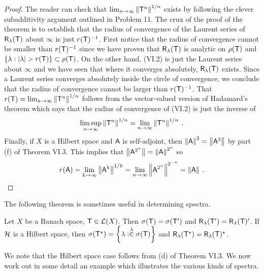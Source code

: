 \begin{proof}
    The reader can check that $\lim_{n \rightarrow \infty} \left \Vert \mathsf{T}^n \right \Vert^{1/n}$ exists by following the clever subadditivity argument outlined in Problem 11. The crux of the proof of the theorem is to establish that the radius of convergence of the Laurent series of $\mathsf{R}_\lambda( \mathsf{T} )$ about $\infty$ is just $r(\mathsf{T})^{-1}$. First notice that the radius of convergence cannot be smaller than $r(\mathsf{T})^{-1}$ since we have proven that $\mathsf{R}_\lambda( \mathsf{T} )$ is analytic on $\rho(\mathsf{T})$ and $\left \lbrace \lambda : |\lambda| > r(\mathsf{T}) \right \rbrace \subset \rho (\mathsf{T})$. On the other hand, (VI.2) is just the Laurent series about $\infty$ and we have seen that where it converges absolutely, $\mathsf{R}_\lambda( \mathsf{T} )$ exists. Since a Laurent series converges absolutely inside the circle of convergence, we conclude that the radius of convergence cannot be larger than $r(\mathsf{T})^{-1}$. That $r(\mathsf{T}) = \lim_{n \rightarrow \infty} \left \Vert \mathsf{T}^n \right \Vert^{1/n}$ follows from the vector-valued version of Hadamard’s theorem which says that the radius of convergence of (VI.2) is just the inverse of
    \begin{align}
        \limsup_{n \rightarrow \infty} \left \Vert \mathsf{T}^n \right \Vert^{1/n} = \lim_{n \rightarrow \infty} \left \Vert \mathsf{T}^n \right \Vert^{1/n} \:.
    \end{align}
    Finally, if $X$ is a Hilbert space and $\mathsf{A}$ is self-adjoint, then $\left \Vert \mathsf{A} \right \Vert^2 = \left \Vert \mathsf{A}^2 \right \Vert$ by part (f) of Theorem VI.3. This implies that $\left \Vert \mathsf{A}^{2^n} \right \Vert = \left \Vert \mathsf{A} \right \Vert^{2^n}$ so \begin{align}
        r(\mathsf{A}) = \lim_{k \rightarrow \infty} \left \Vert \mathsf{A}^k \right \Vert^{1/k} = \lim_{n \rightarrow \infty} \left \Vert \mathsf{A}^{2^n} \right \Vert^{2^{-n}} = \left \Vert \mathsf{A} \right \Vert \:.
    \end{align}
\end{proof}

The following theorem is sometimes useful in determining spectra.

\begin{theorem}[Phillips]
    Let $X$ be a Banach space, $\mathsf{T} \in \mathcal L(X)$. Then $\sigma(\mathsf{T}) = \sigma (\mathsf{T}')$ and $\mathsf{R}_\lambda (\mathsf{T}') = \mathsf{R}_\lambda (\mathsf{T})'$. If $\mathcal{H}$ is a Hilbert space, then $\sigma (\mathsf{T}^\star) = \left \lbrace \lambda : \overset \lambda \in \sigma (\mathsf{T})  \right \rbrace$ and $\mathsf{R}_\lambda (\mathsf{T}^\star) = \mathsf{R}_\lambda (\mathsf{T})^\star$.
\end{theorem}

We note that the Hilbert space case follows from (d) of Theorem VI.3.
We now work out in some detail an example which illustrates the various
kinds of spectra.

